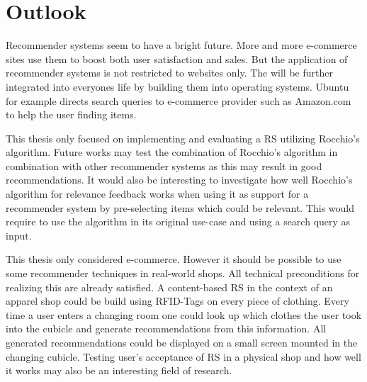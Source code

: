 

\section{Outlook}

Recommender systems seem to have a bright future.
More and more e-commerce sites use them to boost both user satisfaction and sales.
\citep[p.~4-7]{ricci:2011}
But the application of recommender systems is not restricted to websites only.
The will be further integrated into everyones life by building them into operating systems.
Ubuntu for example directs search queries to e-commerce provider such as Amazon.com to help the user finding items.\citep{ubuntu:2014}

This thesis only focused on implementing and evaluating a RS utilizing Rocchio's algorithm.
Future works may test the combination of Rocchio's algorithm in combination with other recommender systems as this may result in good recommendations.
It would also be interesting to investigate how well Rocchio's algorithm for relevance feedback works when using it as support for a recommender system by pre-selecting items which could be relevant.
This would require to use the algorithm in its original use-case and using a search query as input.

This thesis only considered e-commerce.
However it should be possible to use some recommender techniques in real-world shops.
All technical preconditions for realizing this are already satisfied.
A content-based RS in the context of an apparel shop could be build using RFID-Tags on every piece of clothing.
Every time a user enters a changing room one could look up which clothes the user took into the cubicle and generate recommendations from this information.
All generated recommendations could be displayed on a small screen mounted in the changing cubicle.
Testing user's acceptance of RS in a physical shop and how well it works may also be an interesting field of research.

